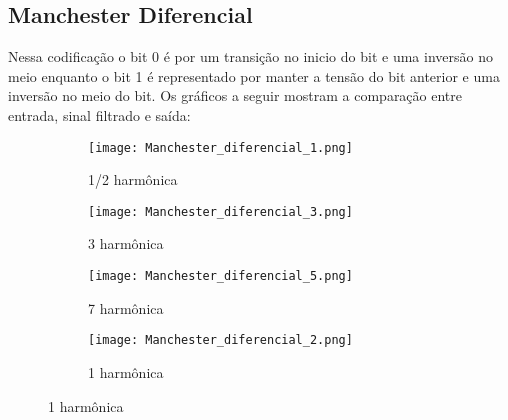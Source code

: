 \documentclass{article}
\begin{document}
        \subsection{Manchester Diferencial}
            Nessa codificação o bit 0 é por um transição no inicio do bit e uma inversão no meio enquanto o bit 1 é representado por manter a tensão do bit anterior e uma inversão no meio do bit. Os gráficos a seguir mostram a comparação entre entrada, sinal filtrado e saída:
            \begin{figure}[H]
                \begin{multicols}{2}
                    \begin{figure}[H]
                        \begin{center}
                            \texttt{[image: Manchester\_diferencial\_1.png]}
                            \caption{1/2 harmônica}
                            \label{fig:Manchester_diferencial_1}
                        \end{center}
                    \end{figure}
                    \begin{figure}[H]
                        \begin{center}
                            \texttt{[image: Manchester\_diferencial\_3.png]}
                            \caption{3 harmônica}
                            \label{fig:Manchester_diferencial_3}
                        \end{center}
                    \end{figure}
                    \begin{figure}[H]
                        \begin{center}
                            \texttt{[image: Manchester\_diferencial\_5.png]}
                            \caption{7 harmônica}
                            \label{fig:Manchester_diferencial_5}
                        \end{center}
                    \end{figure}
                    \begin{figure}[H]
                        \begin{center}
                            \texttt{[image: Manchester\_diferencial\_2.png]}
                            \caption{1 harmônica}
                            \label{fig:Manchester_diferencial_2}
                        \end{center}
                    \end{figure}
                

\end{multicols}
\end{figure}
\end{document}
